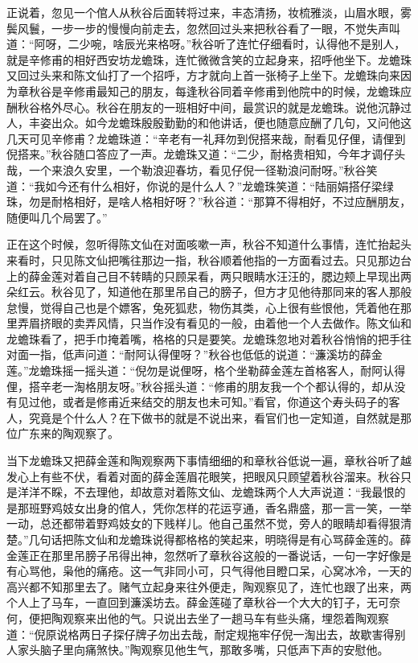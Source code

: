 \documentclass[12pt,UTF8]{ctexbook}
\begin{document}
{{{正说着，忽见一个倌人从秋谷后面转将过来，丰态清扬，妆梳雅淡，山眉水眼，雾鬓风鬟，一步一步的慢慢向前走去，忽然回过头来把秋谷看了一眼，不觉失声叫道：“阿呀，二少啘，啥辰光来格呀。”秋谷听了连忙仔细看时，认得他不是别人，就是辛修甫的相好西安坊龙蟾珠，连忙微微含笑的立起身来，招呼他坐下。龙蟾珠又回过头来和陈文仙打了一个招呼，方才就向上首一张椅子上坐下。龙蟾珠向来因为章秋谷是辛修甫最知己的朋友，每逢秋谷同着辛修甫到他院中的时候，龙蟾珠应酬秋谷格外尽心。秋谷在朋友的一班相好中间，最赏识的就是龙蟾珠。说他沉静过人，丰姿出众。如今龙蟾珠殷殷勤勤的和他讲话，便也随意应酬了几句，又问他这几天可见辛修甫？龙蟾珠道：“辛老有一礼拜勿到倪搭来哉，耐看见仔俚，请俚到倪搭来。”秋谷随口答应了一声。龙蟾珠又道：“二少，耐格贵相知，今年才调仔头哉，一个来浪久安里，一个勒浪迎春坊，看见仔倪一径勒浪问耐呀。”秋谷笑道：“我如今还有什么相好，你说的是什么人？”龙蟾珠笑道：“陆丽娟搭仔梁绿珠，勿是耐格相好，是啥人格相好呀？”秋谷道：“那算不得相好，不过应酬朋友，随便叫几个局罢了。”

正在这个时候，忽听得陈文仙在对面咳嗽一声，秋谷不知道什么事情，连忙抬起头来看时，只见陈文仙把嘴往那边一指，秋谷顺着他指的一方面看过去。只见那边台上的薛金莲对着自己目不转睛的只顾呆看，两只眼睛水汪汪的，腮边颊上早现出两朵红云。秋谷见了，知道他在那里吊自己的膀子，但方才见他待那同来的客人那般怠慢，觉得自己也是个嫖客，兔死狐悲，物伤其类，心上很有些恨他，凭着他在那里弄眉挤眼的卖弄风情，只当作没有看见的一般，由着他一个人去做作。陈文仙和龙蟾珠看了，把手巾掩着嘴，格格的只是要笑。龙蟾珠忽地对着秋谷悄悄的把手往对面一指，低声问道：“耐阿认得俚呀？”秋谷也低低的说道：“濂溪坊的薛金莲。”龙蟾珠摇一摇头道：“倪勿是说俚呀，格个坐勒薛金莲左首格客人，耐阿认得俚，搭辛老一淘格朋友呀。”秋谷摇头道：“修甫的朋友我一个个都认得的，却从没有见过他，或者是修甫近来结交的朋友也未可知。”看官，你道这个寿头码子的客人，究竟是个什么人？在下做书的就是不说出来，看官们也一定知道，自然就是那位广东来的陶观察了。

当下龙蟾珠又把薛金莲和陶观察两下事情细细的和章秋谷低说一遍，章秋谷听了越发心上有些不伏，看着对面的薛金莲眉花眼笑，把眼风只顾望着秋谷溜来。秋谷只是洋洋不睬，不去理他，却故意对着陈文仙、龙蟾珠两个人大声说道：“我最恨的是那班野鸡妓女出身的倌人，凭你怎样的花运亨通，香名鼎盛，那一言一笑，一举一动，总还都带着野鸡妓女的下贱样儿。他自己虽然不觉，旁人的眼睛却看得狠清楚。”几句话把陈文仙和龙蟾珠说得都格格的笑起来，明晓得是有心骂薛金莲的。薛金莲正在那里吊膀子吊得出神，忽然听了章秋谷这般的一番说话，一句一字好像是有心骂他，枭他的痛疮。这一气非同小可，只气得他目瞪口呆，心窝冰冷，一天的高兴都不知那里去了。赌气立起身来往外便走，陶观察见了，连忙也跟了出来，两个人上了马车，一直回到濂溪坊去。薛金莲碰了章秋谷一个大大的钉子，无可奈何，便把陶观察来出他的气。只说出去坐了一趟马车有些头痛，埋怨着陶观察道：“倪原说格两日子探仔牌子勿出去哉，耐定规拖牢仔倪一淘出去，故歇害得别人家头脑子里向痛煞快。”陶观察见他生气，那敢多嘴，只低声下声的安慰他。

}}}
\end{document}
